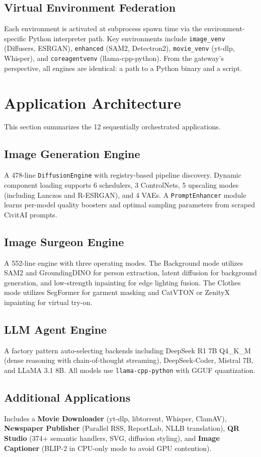 \documentclass[conference]{IEEEtran}
\begin{document}
\subsection{Virtual Environment Federation}
Each environment is activated at subprocess spawn time via the environment-specific Python interpreter path. Key environments include \texttt{image\_venv} (Diffusers, ESRGAN), \texttt{enhanced} (SAM2, Detectron2), \texttt{movie\_venv} (yt-dlp, Whisper), and \texttt{coreagentvenv} (llama-cpp-python). From the gateway's perspective, all engines are identical: a path to a Python binary and a script.

\section{Application Architecture}
This section summarizes the 12 sequentially orchestrated applications.

\subsection{Image Generation Engine}
A 478-line \texttt{DiffusionEngine} with registry-based pipeline discovery. Dynamic component loading supports 6 schedulers, 3 ControlNets, 5 upscaling modes (including Lanczos and R-ESRGAN), and 4 VAEs. A \texttt{PromptEnhancer} module learns per-model quality boosters and optimal sampling parameters from scraped CivitAI prompts.

\subsection{Image Surgeon Engine}
A 552-line engine with three operating modes. The Background mode utilizes SAM2 and GroundingDINO for person extraction, latent diffusion for background generation, and low-strength inpainting for edge lighting fusion. The Clothes mode utilizes SegFormer for garment masking and CatVTON or ZenityX inpainting for virtual try-on.

\subsection{LLM Agent Engine}
A factory pattern auto-selecting backends including DeepSeek R1 7B Q4\_K\_M (dense reasoning with chain-of-thought streaming), DeepSeek-Coder, Mistral 7B, and LLaMA 3.1 8B. All models use \texttt{llama-cpp-python} with GGUF quantization.

\subsection{Additional Applications}
Includes a \textbf{Movie Downloader} (yt-dlp, libtorrent, Whisper, ClamAV), \textbf{Newspaper Publisher} (Parallel RSS, ReportLab, NLLB translation), \textbf{QR Studio} (374+ semantic handlers, SVG, diffusion styling), and \textbf{Image Captioner} (BLIP-2 in CPU-only mode to avoid GPU contention).
\end{document}
